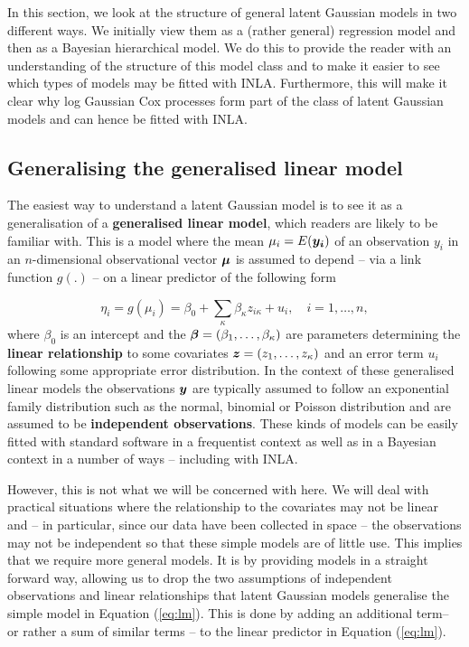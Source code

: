 
In this section, we look at the structure of general latent Gaussian models in two different ways. We initially view them as a (rather general) regression model and then as a Bayesian hierarchical model.  We do this to provide the reader with an understanding of the structure of this model class and to make it easier to see which types of models may be fitted with INLA. Furthermore, this will make it clear why log Gaussian Cox processes form part of the class of latent Gaussian models and can hence be fitted with INLA.

\subsection{Generalising the generalised linear model}

The easiest way to understand a latent Gaussian model is to see it as a generalisation of a \textbf{generalised linear model}, which readers are likely to be familiar with. This is a model where the mean $\mu_i = E(\boldsymbol{y_i})$ of an observation $y_i$  in an $n$-dimensional observational vector $\boldsymbol{\mu}$ is assumed to depend -- via a link function $g(.)$ --  on a linear predictor of the following form

\begin{equation}	
\eta_i=g(\mu_i)=\beta_{0}+\sum_{\kappa} \beta_{\kappa} z_{i \kappa}+ u_i,\quad i=1,\ldots, n,\label{eq:lm}
\end{equation}
where $\beta_{0}$ is an intercept and the $\boldsymbol{\beta} = (\beta_1, \ldots, \beta_{\kappa})$ are parameters determining the \textbf{linear relationship} to some covariates $\boldsymbol{z} = (z_1, \ldots, z_{\kappa})$ and an error term $u_i$ following some appropriate error distribution. In the context of these generalised linear models the observations $\boldsymbol{y}$ are typically assumed to follow an exponential family distribution such as the normal, binomial or Poisson distribution and are assumed to be \textbf{independent observations}. These kinds of models can be easily fitted with standard software in a frequentist context as well as in a Bayesian context in a number of ways -- including with INLA. 

However, this is not what we will be concerned with here. We will deal with practical situations where  the relationship to the covariates may not be linear and --  in particular, since our data have been collected in space -- the observations may not be independent so that these simple models are of little use.  This implies that we require more general models. It is by providing models in a straight forward way, allowing us to drop the two assumptions of independent observations and linear relationships that latent Gaussian models generalise the simple model in Equation (\ref{eq:lm}). This is done by adding an additional term-- or  rather a sum of similar terms -- to the linear predictor in Equation (\ref{eq:lm}).

